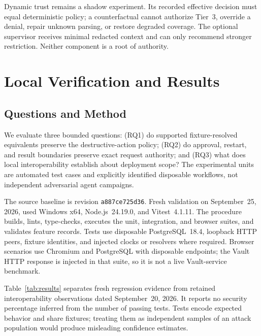 \documentclass[conference,letterpaper]{IEEEtran}
\begin{document}
Dynamic trust remains a shadow experiment. Its recorded effective decision must equal deterministic policy; a counterfactual cannot authorize Tier~3, override a denial, repair unknown parsing, or restore degraded coverage. The optional supervisor receives minimal redacted context and can only recommend stronger restriction. Neither component is a root of authority.

\section{Local Verification and Results}
\subsection{Questions and Method}
We evaluate three bounded questions: (RQ1) do supported fixture-resolved equivalents preserve the destructive-action policy; (RQ2) do approval, restart, and result boundaries preserve exact request authority; and (RQ3) what does local interoperability establish about deployment scope? The experimental units are automated test cases and explicitly identified disposable workflows, not independent adversarial agent campaigns.

The source baseline is revision \texttt{a887ce725d36}. Fresh validation on September~25, 2026, used Windows x64, Node.js~24.19.0, and Vitest~4.1.11. The procedure builds, lints, type-checks, executes the unit, integration, and browser suites, and validates feature records. Tests use disposable PostgreSQL~18.4, loopback HTTP peers, fixture identities, and injected clocks or resolvers where required. Browser scenarios use Chromium and PostgreSQL with disposable endpoints; the Vault HTTP response is injected in that suite, so it is not a live Vault-service benchmark.

Table~\ref{tab:results} separates fresh regression evidence from retained interoperability observations dated September~20, 2026. It reports no security percentage inferred from the number of passing tests. Tests encode expected behavior and share fixtures; treating them as independent samples of an attack population would produce misleading confidence estimates.
\end{document}
